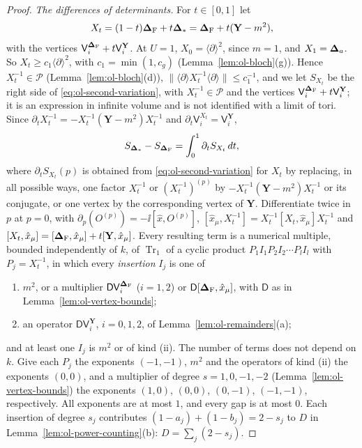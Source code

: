 \begin{proof}
\emph{The differences of determinants.} For $t\in[0,1]$ let
\[
X_t=(1-t)\boldsymbol{\Delta}_{\rm F}+t\boldsymbol{\Delta}_*=\boldsymbol{\Delta}_{\rm F}+t(\mathbf Y-m^2),
\]
with the vertices $\mathsf V_i^{\boldsymbol{\Delta}_{\rm F}}+t\mathsf V_i^{\mathbf Y}$. At $U=1$, $X_0=\langle\partial\rangle^2$, since $m=1$, and $X_1=\boldsymbol{\Delta}_a$. So $X_t\ge c_1\langle\partial\rangle^2$, with $c_1=\min(1,c_g)$ (Lemma~\ref{lem:ol-bloch}(g)). Hence $X_t^{-1}\in\mathscr P$ (Lemma~\ref{lem:ol-bloch}(d)), $\|\langle\partial\rangle X_t^{-1}\langle\partial\rangle\|\le c_1^{-1}$, and we let $S_{X_t}$ be the right side of \eqref{eq:ol-second-variation}, with $X_t^{-1}\in\mathscr P$ and the vertices $\mathsf V_i^{\boldsymbol{\Delta}_{\rm F}}+t\mathsf V_i^{\mathbf Y}$; it is an expression in infinite volume and is not identified with a limit of tori. Since $\partial_tX_t^{-1}=-X_t^{-1}(\mathbf Y-m^2)X_t^{-1}$ and $\partial_t\mathsf V_i^{X_t}=\mathsf V_i^{\mathbf Y}$,
\[
S_{\boldsymbol{\Delta}_*}-S_{\boldsymbol{\Delta}_{\rm F}}=\int_0^1\partial_tS_{X_t}\,dt,
\]
where $\partial_tS_{X_t}(p)$ is obtained from \eqref{eq:ol-second-variation} for $X_t$ by replacing, in all possible ways, one factor $X_t^{-1}$ or $(X_t^{-1})^{(p)}$ by $-X_t^{-1}(\mathbf Y-m^2)X_t^{-1}$ or its conjugate, or one vertex by the corresponding vertex of $\mathbf Y$. Differentiate twice in $p$ at $p=0$, with $\partial_p(O^{(p)})=-\ii[\hat x,O^{(p)}]$, $[\hat x_\mu,X_t^{-1}]=X_t^{-1}[X_t,\hat x_\mu]X_t^{-1}$ and $[X_t,\hat x_\mu]=[\boldsymbol{\Delta}_{\rm F},\hat x_\mu]+t[\mathbf Y,\hat x_\mu]$. Every resulting term is a numerical multiple, bounded independently of $k$, of $\operatorname{Tr}_1$ of a cyclic product $P_1I_1P_2I_2\cdots P_lI_l$ with $P_j=X_t^{-1}$, in which every \emph{insertion} $I_j$ is one of
\begin{enumerate}[label=(\roman*)]
\item $m^2$, or a multiplier $\mathsf D\mathsf V_i^{\boldsymbol{\Delta}_{\rm F}}$ ($i=1,2$) or $\mathsf D[\boldsymbol{\Delta}_{\rm F},\hat x_\mu]$, with $\mathsf D$ as in Lemma~\ref{lem:ol-vertex-bounds};
\item an operator $\mathsf D\mathsf V_i^{\mathbf Y}$, $i=0,1,2$, of Lemma~\ref{lem:ol-remainders}(a);
\end{enumerate}
and at least one $I_j$ is $m^2$ or of kind (ii). The number of terms does not depend on $k$. Give each $P_j$ the exponents $(-1,-1)$, $m^2$ and the operators of kind (ii) the exponents $(0,0)$, and a multiplier of degree $s=1,0,-1,-2$ (Lemma~\ref{lem:ol-vertex-bounds}) the exponents $(1,0)$, $(0,0)$, $(0,-1)$, $(-1,-1)$, respectively. All exponents are at most $1$, and every gap is at most $0$. Each insertion of degree $s_j$ contributes $(1-a_j)+(1-b_j)=2-s_j$ to $D$ in Lemma~\ref{lem:ol-power-counting}(b): $D=\sum_j(2-s_j)$.


\end{proof}
